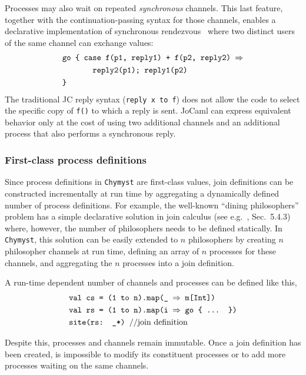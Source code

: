 \documentclass[sigplan,10pt]{acmart}\settopmatter{}
\begin{document}
Processes may also wait on repeated \emph{synchronous} channels. This
last feature, together with the continuation-passing syntax for those
channels, enables a declarative implementation of synchronous rendezvous~\citep{Mil1999}
where two distinct users of the same channel can exchange values:
\begin{align*}
 & \text{\texttt{go \{ case f(p1, reply1) + f(p2, reply2) \ensuremath{\Rightarrow}}}\\
 & \text{\texttt{ ~ ~ ~ reply2(p1); reply1(p2)}}\\
 & \text{\texttt{\}}}
\end{align*}
The traditional JC reply syntax (\texttt{reply x to f}) does not allow
the code to select the specific copy of \texttt{f()} to which a reply
is sent. JoCaml can express equivalent behavior only at the cost of
using two additional channels and an additional process that also
performs a synchronous reply. 

\subsubsection{First-class process definitions\label{subsec:First-class-process-definitions}}

Since process definitions in \texttt{Chymyst} are first-class values,
join definitions can be constructed incrementally at run time by aggregating
a dynamically defined number of process definitions. For example,
the well-known ``dining philosophers'' problem has a simple declarative
solution in join calculus (see e.g.~\citep{VarAgh2013}, Sec.~5.4.3)
where, however, the number of philosophers needs to be defined statically.
In \texttt{Chymyst}, this solution can be easily extended to $n$
philosophers by creating $n$ philosopher channels at run time, defining
an array of $n$ processes for these channels, and aggregating the
$n$ processes into a join definition. 

A run-time dependent number of channels and processes can be defined
like this,
\begin{align*}
 & \text{\texttt{val cs = (1 to n).map(\_ \ensuremath{\Rightarrow} m[Int])}}\\
 & \text{\texttt{val rs = (1 to n).map(i \ensuremath{\Rightarrow} go \{ ... \})}}\\
 & \text{\texttt{site(rs: \_*) \textnormal{//join definition}}}
\end{align*}

Despite this, processes and channels remain immutable. Once a join
definition has been created, is impossible to modify its constituent
processes or to add more processes waiting on the same channels.
\end{document}
